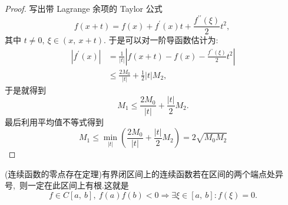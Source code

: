 \begin{proof}
	写出带 Lagrange 余项的 Taylor 公式
	$$f(x+t)=f(x)+f^{\prime}(x) t+\frac{f^{\prime \prime}(\xi)}{2} t^{2},\ $$
	其中 $ t \neq 0,\  \xi \in(x,\  x+t) .$
	于是可以对一阶导函数估计为:
	$$\begin{aligned}
		\left|f^{\prime}(x)\right| & =\frac{1}{|t|}\left|f(x+t)-f(x)-\frac{f^{\prime \prime}(\xi)}{2} t^{2}\right| \\
		& \leqslant \frac{2 M_{0}}{|t|}+\frac{1}{2}|t| M_{2},\ 
	\end{aligned}$$
	于是就得到
	$$M_{1} \leqslant \frac{2 M_{0}}{|t|}+\frac{|t|}{2} M_{2} .$$
	最后利用平均值不等式得到
	$$M_{1} \leqslant \min _{|t|}\left(\frac{2 M_{0}}{|t|}+\frac{|t|}{2} M_{2}\right)=2 \sqrt{M_{0} M_{2}}$$
\end{proof}
\newpage
\begin{theorem}
	(连续函数的零点存在定理)有界闭区间上的连续函数若在区间的两个端点处异号,\ 则一定在此区间上有根.这就是
	$$f\in C[a,\ b],\ f(a)f(b)<0\Rightarrow\exists\xi\in[a,\ b]:f(\xi)=0.$$
\end{theorem}
